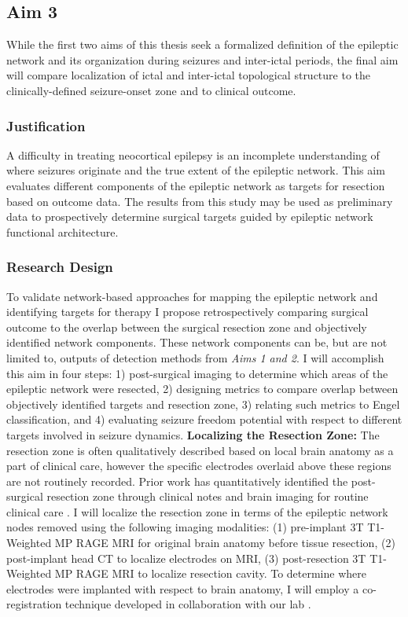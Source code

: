 \subsection{Aim 3}
While the first two aims of this thesis seek a formalized definition of the epileptic network and its organization during seizures and inter-ictal periods, the final aim will compare localization of ictal and inter-ictal topological structure to the clinically-defined seizure-onset zone and to clinical outcome.

\subsubsection{Justification}
A difficulty in treating neocortical epilepsy is an incomplete understanding of where seizures originate and the true extent of the epileptic network. This aim evaluates different components of the epileptic network as targets for resection based on outcome data. The results from this study may be used as preliminary data to prospectively determine surgical targets guided by epileptic network functional architecture.

\subsubsection{Research Design}
To validate network-based approaches for mapping the epileptic network and identifying targets for therapy I propose retrospectively comparing surgical outcome to the overlap between the surgical resection zone and objectively identified network components. These network components can be, but are not limited to, outputs of detection methods from \textit{Aims 1 and 2}. I will accomplish this aim in four steps: 1) post-surgical imaging to determine which areas of the epileptic network were resected, 2) designing metrics to compare overlap between objectively identified targets and resection zone, 3) relating such metrics to Engel classification, and 4) evaluating seizure freedom potential with respect to different targets involved in seizure dynamics.
\textbf{Localizing the Resection Zone:}
The resection zone is often qualitatively described based on local brain anatomy as a part of clinical care, however the specific electrodes overlaid above these regions are not routinely recorded. Prior work has quantitatively identified the post-surgical resection zone through clinical notes and brain imaging for routine clinical care \cite{jacobs2010high-frequency, wu2010removing}. I will localize the resection zone in terms of the epileptic network nodes removed using the following imaging modalities: (1) pre-implant 3T T1-Weighted MP RAGE MRI for original brain anatomy before tissue resection, (2) post-implant head CT to localize electrodes on MRI, (3) post-resection 3T T1-Weighted MP RAGE MRI to localize resection cavity. To determine where electrodes were implanted with respect to brain anatomy, I will employ a co-registration technique developed in collaboration with our lab \cite{wu2012brain}.

